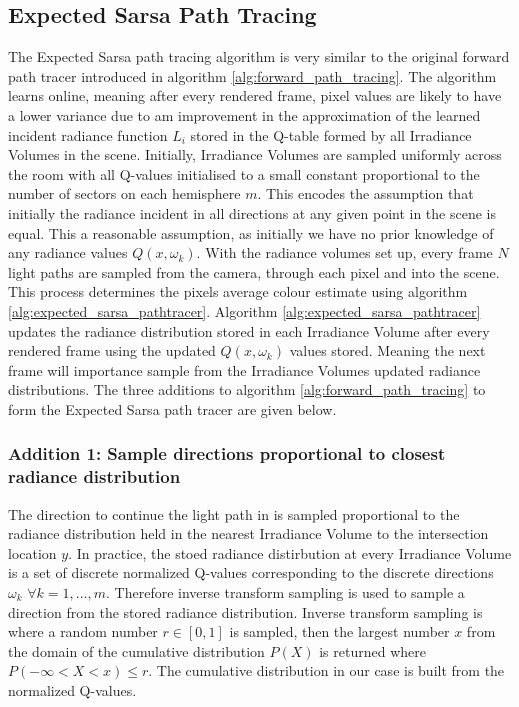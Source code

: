\documentclass[../dissertation.tex]{subfiles}
\begin{document}
\subsection{Expected Sarsa Path Tracing}
\label{sec:expected_sarsa_path_tracer}

The Expected Sarsa path tracing algorithm is very similar to the original forward path tracer introduced in algorithm \ref{alg:forward_path_tracing}. The algorithm learns online, meaning after every rendered frame, pixel values are likely to have a lower variance due to am improvement in the approximation of the learned incident radiance function $L_i$ stored in the Q-table formed by all Irradiance Volumes in the scene. Initially, Irradiance Volumes are sampled uniformly across the room with all Q-values initialised to a small constant proportional to the number of sectors on each hemisphere $m$. This encodes the assumption that initially the radiance incident in all directions at any given point in the scene is equal. This a reasonable assumption, as initially we have no prior knowledge of any radiance values $Q(x, \omega_k)$. With the radiance volumes set up, every frame $N$ light paths are sampled from the camera, through each pixel and into the scene. This process determines the pixels average colour estimate using algorithm \ref{alg:expected_sarsa_pathtracer}. Algorithm \ref{alg:expected_sarsa_pathtracer} updates the radiance distribution stored in each Irradiance Volume after every rendered frame using the updated $Q(x, \omega_k)$ values stored. Meaning the next frame will importance sample from the Irradiance Volumes updated radiance distributions. The three additions to algorithm  \ref{alg:forward_path_tracing} to form the Expected Sarsa path tracer are given below.

\subsubsection*{Addition 1: Sample directions proportional to closest radiance distribution}
The direction to continue the light path in is sampled proportional to the radiance distribution held in the nearest Irradiance Volume to the intersection location $y$. In practice, the stoed radiance distirbution at every Irradiance Volume is a set of discrete normalized Q-values corresponding to the discrete directions $\omega_k$ $\forall k = 1, ..., m$. Therefore inverse transform sampling \cite{devroye2006nonuniform} is used to sample a direction from the stored radiance distribution. Inverse transform sampling is where a random number $r \in [0,1]$ is sampled, then the largest number $x$ from the domain of the cumulative distribution $P(X)$ is returned where $ P(-\infty < X < x) \leq r$. The cumulative distribution in our case is built from the normalized Q-values.
\end{document}
